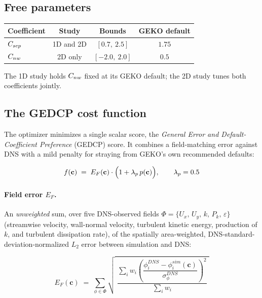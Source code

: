 \subsection{Free parameters}

\begin{center}
\begin{tabular}{@{}lccc@{}}
\toprule
Coefficient & Study & Bounds & GEKO default \\
\midrule
$C_{sep}$ & 1D and 2D & $[0.7,\ 2.5]$ & $1.75$ \\
$C_{nw}$   & 2D only   & $[-2.0,\ 2.0]$ & $0.5$ \\
\bottomrule
\end{tabular}
\end{center}

The 1D study holds $C_{nw}$ fixed at its GEKO default; the 2D study tunes both
coefficients jointly.

\subsection{The GEDCP cost function}

The optimizer minimizes a single scalar score, the \emph{General Error and
Default-Coefficient Preference} (GEDCP) score. It combines a field-matching error
against DNS with a mild penalty for straying from GEKO's own recommended
defaults:

\begin{equation}
f(\mathbf{c}) \;=\; E_F(\mathbf{c}) \cdot \Bigl(1 + \lambda_p\, p(\mathbf{c})\Bigr),
\qquad \lambda_p = 0.5
\label{eq:gedcp}
\end{equation}

\paragraph{Field error $E_F$.} An \emph{unweighted} sum, over five DNS-observed
fields $\Phi = \{U_x,\, U_y,\, k,\, P_k,\, \varepsilon\}$ (streamwise velocity,
wall-normal velocity, turbulent kinetic energy, production of $k$, and
turbulent dissipation rate), of the spatially area-weighted,
DNS-standard-deviation-normalized $L_2$ error between simulation and DNS:

\begin{equation}
E_F(\mathbf{c}) \;=\; \sum_{\phi \in \Phi}
\sqrt{\; \dfrac{\displaystyle\sum_{i} w_i \left(\dfrac{\phi^{DNS}_i - \phi^{sim}_i(\mathbf{c})}{\sigma^{DNS}_\phi}\right)^{\!2}}
{\displaystyle\sum_i w_i} \;}
\label{eq:fielderr}
\end{equation}


